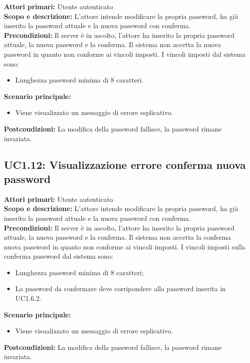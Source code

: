 \documentclass{scalatekids-article}
\begin{document}
\textbf{Attori primari:} Utente autenticato\\
\textbf{Scopo e descrizione:} L'attore intende modificare la propria password, ha già inserito la password attuale e la nuova password con conferma.\\
\textbf{Precondizioni:} Il server è in ascolto, l'attore ha inserito la propria password attuale, la nuova password e la conferma. Il sistema non accetta la nuova password in quanto non conforme ai
vincoli imposti. I vincoli imposti dal sistema sono:
\begin{itemize}
\item Lunghezza password minima di 8 caratteri.
\end{itemize}
\textbf{Scenario principale:}
\begin{itemize}
\item Viene visualizzato un messaggio di errore esplicativo.
\end{itemize}
\textbf{Postcondizioni:} La modifica della password fallisce, la password rimane invariata.

\subsection{UC1.12: Visualizzazione errore conferma nuova password}

\textbf{Attori primari:} Utente autenticato\\
\textbf{Scopo e descrizione:} L'attore intende modificare la propria password, ha già inserito la password attuale e la nuova password con conferma.\\
\textbf{Precondizioni:} Il server è in ascolto, l'attore ha inserito la propria password attuale, la nuova password e la conferma. Il sistema non accetta la conferma nuova password in quanto non conforme ai
vincoli imposti. I vincoli imposti sulla conferma password dal sistema sono:
\begin{itemize}
\item Lunghezza password minima di 8 caratteri;
\item La password da confermare deve corripondere alla password inserita in UC1.6.2.
\end{itemize}
\textbf{Scenario principale:}
\begin{itemize}
\item Viene visualizzato un messaggio di errore esplicativo.
\end{itemize}
\textbf{Postcondizioni:} La modifica della password fallisce, la password rimane invariata.
\end{document}
